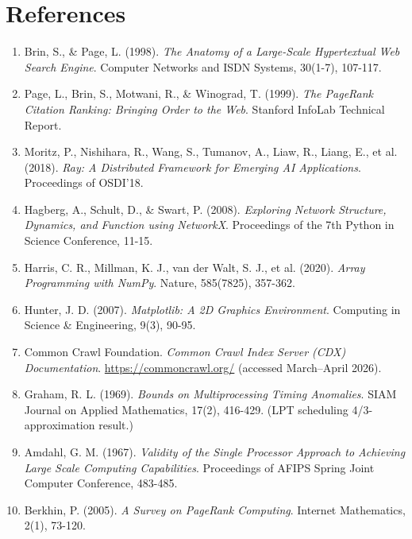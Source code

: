 \documentclass[11pt,a4paper]{article}
\begin{document}
\section*{References}
\begin{enumerate}[
    label=\arabic*.,
    leftmargin=3.4em,
    labelsep=0.65em,
    itemsep=6pt,
    parsep=3pt,
    topsep=10pt
]
    \item Brin, S., \& Page, L. (1998). \textit{The Anatomy of a
    Large-Scale Hypertextual Web Search Engine}. Computer Networks
    and ISDN Systems, 30(1-7), 107-117.
    \item Page, L., Brin, S., Motwani, R., \& Winograd, T. (1999).
    \textit{The PageRank Citation Ranking: Bringing Order to the Web}.
    Stanford InfoLab Technical Report.
    \item Moritz, P., Nishihara, R., Wang, S., Tumanov, A., Liaw, R.,
    Liang, E., et al. (2018). \textit{Ray: A Distributed Framework for
    Emerging AI Applications}. Proceedings of OSDI'18.
    \item Hagberg, A., Schult, D., \& Swart, P. (2008).
    \textit{Exploring Network Structure, Dynamics, and Function using
    NetworkX}. Proceedings of the 7th Python in Science Conference,
    11-15.
    \item Harris, C. R., Millman, K. J., van der Walt, S. J., et al.
    (2020). \textit{Array Programming with NumPy}. Nature, 585(7825),
    357-362.
    \item Hunter, J. D. (2007). \textit{Matplotlib: A 2D Graphics
    Environment}. Computing in Science \& Engineering, 9(3), 90-95.
    \item Common Crawl Foundation. \textit{Common Crawl Index Server
    (CDX) Documentation}. \url{https://commoncrawl.org/} (accessed
    March--April 2026).
    \item Graham, R. L. (1969). \textit{Bounds on Multiprocessing
    Timing Anomalies}. SIAM Journal on Applied Mathematics, 17(2),
    416-429. (LPT scheduling 4/3-approximation result.)
    \item Amdahl, G. M. (1967). \textit{Validity of the Single
    Processor Approach to Achieving Large Scale Computing
    Capabilities}. Proceedings of AFIPS Spring Joint Computer
    Conference, 483-485.
    \item Berkhin, P. (2005). \textit{A Survey on PageRank Computing}.
    Internet Mathematics, 2(1), 73-120.
\end{enumerate}
\end{document}
